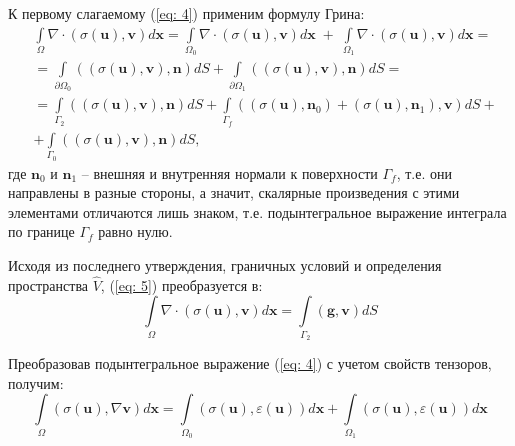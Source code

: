 \documentclass[a4paper, 14pt]{extreport}
\begin{document}
К первому слагаемому (\ref{eq: 4}) применим формулу Грина:
\begin{equation}
	\label{eq: 5}
	\begin{aligned}
		& \int\limits_\Omega{\nabla\!\cdot\!(\sigma(\textbf{u}), \textbf{v})}d\textbf{x} = 
		\int\limits_{\Omega_0}{\nabla\!\cdot\!(\sigma(\textbf{u}), \textbf{v})}d\textbf{x} \; +  \;
		\int\limits_{\Omega_1}{\nabla\!\cdot\!(\sigma(\textbf{u}), \textbf{v})}d\textbf{x} = \\
		& = \int\limits_{\partial\Omega_0}{((\sigma(\textbf{u}), \textbf{v}), \textbf{n})}dS + 
		\int\limits_{\partial\Omega_1}{((\sigma(\textbf{u}), \textbf{v}), \textbf{n})}dS = \\
		& = \int\limits_{\Gamma_2}{((\sigma(\textbf{u}), \textbf{v}), \textbf{n})}dS + 
		\int\limits_{\Gamma_f}{((\sigma(\textbf{u}), \textbf{n}_0) + (\sigma(\textbf{u}), \textbf{n}_1), \textbf{v})}dS + \\
		& + \int\limits_{\Gamma_0}{((\sigma(\textbf{u}), \textbf{v}), \textbf{n})}dS,
	\end{aligned}
\end{equation}
где $\textbf{n}_0$ и $\textbf{n}_1$ -- внешняя и внутренняя нормали к поверхности $\Gamma_f$,
т.е. они направлены в разные стороны, а значит, скалярные произведения с этими элементами 
отличаются лишь знаком, т.е. подынтегральное выражение интеграла по границе $\Gamma_f$ 
равно нулю.

Исходя из последнего утверждения, граничных условий и определения пространства $\hat{V}$,
(\ref{eq: 5}) преобразуется в:
\begin{equation}
	\label{eq: 6}
	\int\limits_\Omega{\nabla\!\cdot\!(\sigma(\textbf{u}), \textbf{v})}d\textbf{x} = 
	\int\limits_{\Gamma_2}{(\textbf{g}, \textbf{v})}dS
\end{equation}

Преобразовав подынтегральное выражение (\ref{eq: 4}) с учетом свойств тензоров, получим:
\begin{equation}
	\label{eq: 7}
	\int\limits_\Omega{(\sigma(\textbf{u}), \nabla \textbf{v})}d\textbf{x} = 
	\int\limits_{\Omega_0}{(\sigma(\textbf{u}), \varepsilon(\textbf{u}))}d\textbf{x} + 
	\int\limits_{\Omega_1}{(\sigma(\textbf{u}), \varepsilon(\textbf{u}))}d\textbf{x}
\end{equation}
\end{document}
